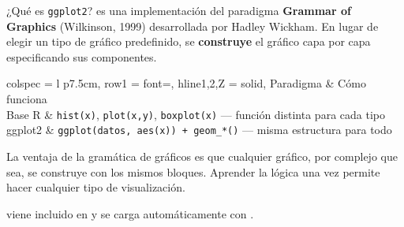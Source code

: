 \documentclass[8pt]{beamer}
\begin{document}
	\begin{frame}{¿Qué es \texttt{ggplot2}?}
		 es una implementación del paradigma \textbf{Grammar of Graphics} (Wilkinson, 1999) desarrollada por Hadley Wickham. En lugar de elegir un tipo de gráfico predefinido, se \textbf{construye} el gráfico capa por capa especificando sus componentes.

		\begin{center}
			\small
			\begin{tblr}{
				colspec  = {l p{7.5cm}},
				row{1}   = {font=\bfseries},
				hline{1,2,Z} = {solid},
			}
				Paradigma & Cómo funciona\\
				Base R & \texttt{hist(x)}, \texttt{plot(x,y)}, \texttt{boxplot(x)} --- función distinta para cada tipo\\
				ggplot2 & \texttt{ggplot(datos, aes(x)) + geom\_*()} --- misma estructura para todo\\
			\end{tblr}
		\end{center}

		\begin{exampleblock}{}
			La ventaja de la gramática de gráficos es que cualquier gráfico, por complejo que sea, se construye con los mismos bloques. Aprender la lógica una vez permite hacer cualquier tipo de visualización.
		\end{exampleblock}

		\begin{block}{}
			 viene incluido en  y se carga automáticamente con .
		\end{block}
	\end{frame}
\end{document}
